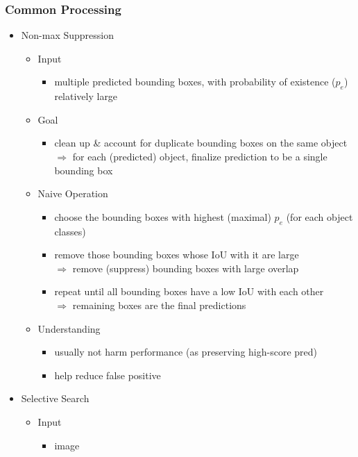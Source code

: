 \subsubsection{Common Processing}
\begin{itemize}
\item Non-max Suppression \label{DL_CV_Objdet_nonmax}
	\begin{itemize}
	\item Input
		\begin{itemize}
		\item multiple predicted bounding boxes, with probability of existence ($p_e$) relatively large
		\end{itemize}
	\item Goal
		\begin{itemize}
		\item clean up \& account for duplicate bounding boxes on the same object \\
		$\Rightarrow$ for each (predicted) object, finalize prediction to be a single bounding box
		\end{itemize}
	\item Naive Operation
		\begin{itemize}
		\item choose the bounding boxes with highest (maximal) $p_e$ (for each object classes)
		\item remove those bounding boxes whose IoU with it are large \\
		$\Rightarrow$ remove (suppress) bounding boxes with large overlap
		\item repeat until all bounding boxes have a low IoU with each other \\
		$\Rightarrow$ remaining boxes are the final predictions
		\end{itemize}
	\item Understanding
		\begin{itemize}
		\item usually not harm performance (as preserving high-score pred)
		\item help reduce false positive
		\end{itemize}
	\end{itemize}
\item Selective Search
	\begin{itemize}
	\item Input
		\begin{itemize}
		\item image
		\end{itemize}

\end{itemize}
\end{itemize}
